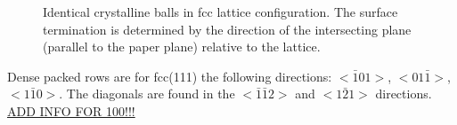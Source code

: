\begin{figure}\centering
	 \quad
	\caption{Identical crystalline balls in fcc lattice configuration. The surface termination is determined by the direction of the intersecting plane (parallel to the paper plane) relative to the lattice.}
	\label{fig:crystal-termination}
\end{figure}

 Dense packed rows are for fcc(111) the following directions: $<\bar 1 01>$, $<01\bar 1>$, $<1\bar 1 0>$. The diagonals are found in the $<\bar 1 \bar 1 2>$ and $<1\bar 2 1>$ directions. \underline{ADD INFO	FOR 100!!!}
 
%

